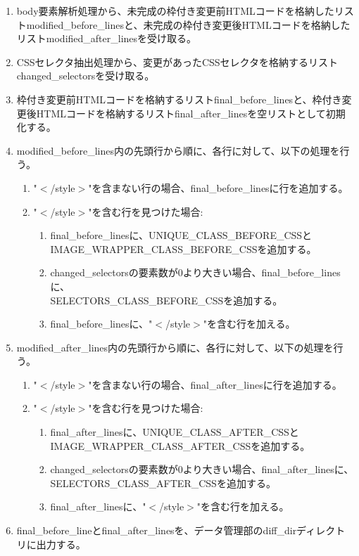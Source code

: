 \begin{enumerate}
    \item body要素解析処理から、未完成の枠付き変更前HTMLコードを格納したリストmodified\_before\_linesと、未完成の枠付き変更後HTMLコードを格納したリストmodified\_after\_linesを受け取る。
    \item CSSセレクタ抽出処理から、変更があったCSSセレクタを格納するリストchanged\_selectorsを受け取る。
    \item 枠付き変更前HTMLコードを格納するリストfinal\_before\_linesと、枠付き変更後HTMLコードを格納するリストfinal\_after\_linesを空リストとして初期化する。
    \item modified\_before\_lines内の先頭行から順に、各行に対して、以下の処理を行う。
          \begin{enumerate}
              \item "$<$/style$>$"を含まない行の場合、final\_before\_linesに行を追加する。
              \item "$<$/style$>$"を含む行を見つけた場合:
                    \begin{enumerate}
                        \item final\_before\_linesに、UNIQUE\_CLASS\_BEFORE\_CSSと\\IMAGE\_WRAPPER\_CLASS\_BEFORE\_CSSを追加する。
                        \item changed\_selectorsの要素数が$0$より大きい場合、final\_before\_linesに、\\SELECTORS\_CLASS\_BEFORE\_CSSを追加する。
                        \item final\_before\_linesに、"$<$/style$>$"を含む行を加える。
                    \end{enumerate}
          \end{enumerate}
    \item modified\_after\_lines内の先頭行から順に、各行に対して、以下の処理を行う。
          \begin{enumerate}
              \item "$<$/style$>$"を含まない行の場合、final\_after\_linesに行を追加する。
              \item "$<$/style$>$"を含む行を見つけた場合:
                    \begin{enumerate}
                        \item final\_after\_linesに、UNIQUE\_CLASS\_AFTER\_CSSと\\IMAGE\_WRAPPER\_CLASS\_AFTER\_CSSを追加する。
                        \item changed\_selectorsの要素数が$0$より大きい場合、final\_after\_linesに、\\SELECTORS\_CLASS\_AFTER\_CSSを追加する。
                        \item final\_after\_linesに、"$<$/style$>$"を含む行を加える。
                    \end{enumerate}
          \end{enumerate}
    \item final\_before\_lineとfinal\_after\_linesを、データ管理部のdiff\_dirディレクトリに出力する。
\end{enumerate}
